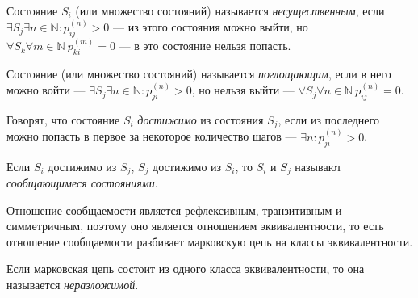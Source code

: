 \begin{definition}
  Состояние $S_i$ (или множество состояний) называется \emph{несущественным}, если
   $\exists S_j \exists n\in \mathbb N\colon p_{ij}^{(n)} > 0$ --- из
  этого состояния можно выйти,
  но $  \forall S_k \forall m \in \mathbb N\ p_{ki}^{(m)} = 0$ --- в это состояние нельзя попасть.
\end{definition}

\begin{definition}
  Состояние (или множество состояний) называется \emph{поглощающим}, если в него
  можно войти ---
  $\exists S_j  \exists n\in\mathbb N\colon p_{ji}^{(n)} > 0$,
  но нельзя выйти ---
  $\forall S_j \forall n \in \mathbb N \ p_{ij}^{(n)} = 0$.
\end{definition}

\begin{definition}
  Говорят, что состояние $S_i$ \emph{достижимо} из состояния $S_j$, если из
  последнего можно попасть в первое за некоторое количество шагов --- $\exists n\colon p_{ji}^{(n)} > 0$.
\end{definition}

\begin{definition}
  Если $S_i$ достижимо из $S_j$, $S_j$ достижимо из $S_i$, то $S_i$ и $S_j$
  называют \emph{сообщающимеся
  состояниями}.
\end{definition}

Отношение сообщаемости является рефлексивным, транзитивным и симметричным, поэтому оно является 
отношением эквивалентности, то есть отношение сообщаемости разбивает марковскую цепь на классы эквивалентности.

\begin{definition}
  Если марковская цепь состоит из одного класса эквивалентности, то она называется
  \emph{неразложимой}.
\end{definition}

